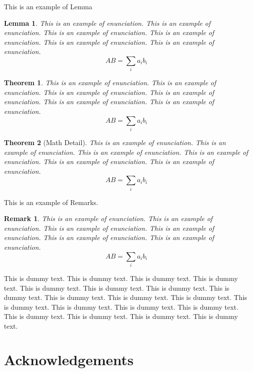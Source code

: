 \documentclass{jpp}
\newtheorem{theorem}{Theorem}
\newtheorem{lemma}{Lemma}
\newtheorem{remark}{Remark}
\begin{document}
This is an example of Lemma
\begin{lemma}
This is an example of enunciation. This is an example of enunciation. This is an
example of enunciation. This is an example of enunciation. This is an example of enunciation.
This is an example of enunciation.
\begin{equation*}
AB = \sum_{i} a_{i} b_{i}
\end{equation*}
\end{lemma}

\begin{theorem}
This is an example of enunciation. This is an example of enunciation. This is an
example of enunciation. This is an example of enunciation. This is an example of enunciation.
This is an example of enunciation.
\begin{equation*}
AB = \sum_{i} a_{i} b_{i}
\end{equation*}
\end{theorem}

\begin{theorem}[Math Detail]
This is an example of enunciation. This is an example of enunciation. This is an
example of enunciation. This is an example of enunciation. This is an example of enunciation.
This is an example of enunciation.
\begin{equation*}
AB = \sum_{i} a_{i} b_{i}
\end{equation*}
\end{theorem}

This is an example of Remarks.

\begin{remark}
This is an example of enunciation. This is an example of enunciation. This is an
example of enunciation. This is an example of enunciation. This is an example of enunciation.
This is an example of enunciation.
\begin{equation*}
AB = \sum_{i} a_{i} b_{i}
\end{equation*}
\end{remark}

This is dummy text. This is dummy text. This is dummy text. This is dummy text. This is
dummy text. This is dummy text. This is dummy text. This is dummy text. This is dummy
text. This is dummy text. This is dummy text. This is dummy text. This is dummy text. This
is dummy text. This is dummy text. This is dummy text. This is dummy text. This is dummy
text. This is dummy text.

\section*{Acknowledgements}
\end{document}
